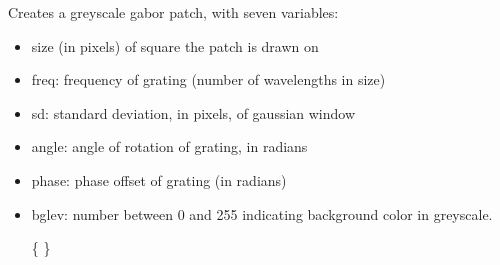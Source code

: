 \documentclass[letterpaper,10pt,english]{sphinxmanual}
\begin{document}
\sphinxAtStartPar
Creates a greyscale gabor patch, with seven variables:
\begin{itemize}
\item {} 
\sphinxAtStartPar
size (in pixels) of square the patch is drawn on

\item {} 
\sphinxAtStartPar
freq: frequency of grating (number of wavelengths in size)

\item {} 
\sphinxAtStartPar
sd: standard deviation, in pixels, of gaussian window

\item {} 
\sphinxAtStartPar
angle: angle of rotation of grating, in radians

\item {} 
\sphinxAtStartPar
phase: phase offset of grating (in radians)

\item {} 
\sphinxAtStartPar
bglev: number between 0 and 255 indicating background color in greyscale.

\sphinxAtStartPar
\{ \}

\end{itemize}

\sphinxAtStartPar
{}

\begin{sphinxVerbatim}[commandchars=\\\{\}]
\end{sphinxVerbatim}

\sphinxAtStartPar
{}

\begin{sphinxVerbatim}[commandchars=\\\{\}]
\end{sphinxVerbatim}

\sphinxAtStartPar
{}
\end{document}
